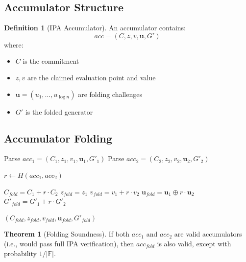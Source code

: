 \documentclass[11pt,a4paper]{article}
\theoremstyle{definition}
\newtheorem{definition}{Definition}
\newtheorem{theorem}{Theorem}
\begin{document}
\subsection{Accumulator Structure}

\begin{definition}[IPA Accumulator]
    An accumulator contains:
    \[
    acc = (C, z, v, \mathbf{u}, G')
    \]
    where:
    \begin{itemize}
        \item $C$ is the commitment
        \item $z, v$ are the claimed evaluation point and value
        \item $\mathbf{u} = (u_1, \ldots, u_{\log n})$ are folding challenges
        \item $G'$ is the folded generator
    \end{itemize}
\end{definition}

\subsection{Accumulator Folding}

\begin{algorithm}
\caption{Accumulator Folding}
\begin{algorithmic}[1]
    \State Parse $acc_1 = (C_1, z_1, v_1, \mathbf{u}_1, G'_1)$
    \State Parse $acc_2 = (C_2, z_2, v_2, \mathbf{u}_2, G'_2)$

    \State $r \gets H(acc_1, acc_2)$ 

    \State $C_{fold} = C_1 + r \cdot C_2$
    \State $z_{fold} = z_1$ 
    \State $v_{fold} = v_1 + r \cdot v_2$
    \State $\mathbf{u}_{fold} = \mathbf{u}_1 \oplus r \cdot \mathbf{u}_2$ 
    \State $G'_{fold} = G'_1 + r \cdot G'_2$

    \State \Return $(C_{fold}, z_{fold}, v_{fold}, \mathbf{u}_{fold}, G'_{fold})$
\EndFunction
\end{algorithmic}
\end{algorithm}

\begin{theorem}[Folding Soundness]
    If both $acc_1$ and $acc_2$ are valid accumulators (i.e., would pass full IPA verification), then $acc_{fold}$ is also valid, except with probability $1/|\mathbb{F}|$.
\end{theorem}
\end{document}
